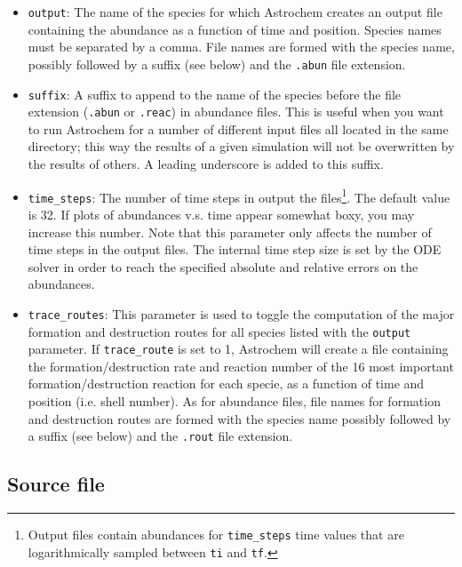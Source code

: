 \documentclass[a4paper,12pt]{article}
\begin{document}
\begin{itemize}

\item \verb=output=: The name of the species for which Astrochem
  creates an output file containing the abundance as a function of
  time and position. Species names must be separated by a comma. File
  names are formed with the species name, possibly followed by a
  suffix (see below) and the \verb=.abun= file extension.

\item \verb=suffix=: A suffix to append to the name of the species
  before the file extension (\verb=.abun= or \verb=.reac=) in
  abundance files. This is useful when you want to run Astrochem for a
  number of different input files all located in the same directory;
  this way the results of a given simulation will not be overwritten
  by the results of others. A leading underscore is added to this
  suffix.

\item \verb=time_steps=: The number of time steps in output the
  files\footnote{Output files contain abundances for \verb=time_steps=
    time values that are logarithmically sampled between \verb=ti= and
    \verb=tf=.}. The default value is 32. If plots of abundances
  v.s. time appear somewhat boxy, you may increase this number. Note
  that this parameter only affects the number of time steps in the
  output files. The internal time step size is set by the ODE solver
  in order to reach the specified absolute and relative errors on the
  abundances.

\item \verb=trace_routes=: This parameter is used to toggle the
  computation of the major formation and destruction routes for all
  species listed with the \verb=output= parameter. If
  \verb=trace_route= is set to 1, Astrochem will create a file
  containing the formation/destruction rate and reaction number of the
  16 most important formation/destruction reaction for each specie, as
  a function of time and position (i.e. shell number). As for
  abundance files, file names for formation and destruction routes are
  formed with the species name possibly followed by a suffix (see
  below) and the \verb=.rout= file extension.

\end{itemize}

\subsection{Source file}
\label{sec:source-file}
\end{document}
